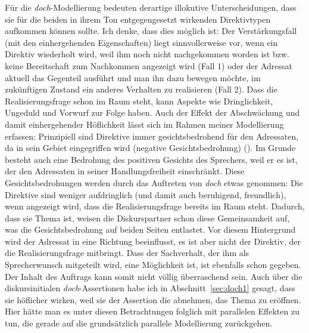\pagebreak Für die \textit{doch}-Modellierung bedeuten derartige illokutive Unterscheidungen, dass sie für die beiden in ihrem Ton entgegengesetzt wirkenden Direktivtypen aufkommen können sollte. Ich denke, dass dies möglich ist: Der Verstärkungsfall (mit den einhergehenden Eigenschaften) liegt sinnvollerweise vor, wenn ein Direktiv wiederholt wird, weil ihm noch nicht nachgekommen worden ist bzw. keine Bereitschaft zum Nachkommen angezeigt wird (Fall 1) oder der Adressat aktuell das Gegenteil ausführt und man ihn dazu bewegen möchte, im zukünftigen Zustand ein anderes Verhalten zu realisieren (Fall 2). Dass die Realisierungsfrage schon im Raum steht, kann Aspekte wie Dringlichkeit, Ungeduld und Vorwurf zur Folge haben. Auch der Effekt der Abschwächung und damit einhergehender Höflichkeit lässt sich im Rahmen meiner Modellierung erfassen: Prinzipiell sind Direktive immer gesichtsbedrohend für den Adressaten, da in sein Gebiet eingegriffen wird (negative  Gesichtsbedrohung) (\citealt[127]{Held1995}). Im Grunde besteht auch eine Bedrohung des positiven Gesichts des Sprechers, weil er es ist, der den Adressaten in seiner Handlungsfreiheit einschränkt. Diese Gesichtsbedrohungen werden durch das Auftreten von \textit{doch} etwas genommen: Die Direktive sind weniger aufdringlich (und damit auch beruhigend, freundlich), wenn angezeigt wird, dass die Realisierungsfrage bereits im Raum steht. Dadurch, dass sie Thema ist, weisen die Diskurspartner schon diese Gemeinsamkeit auf, was die Gesichtsbedrohung auf beiden Seiten entlastet. Vor diesem Hintergrund wird der Adressat in eine Richtung beeinflusst, es ist aber nicht der Direktiv, der die Realisierungsfrage mitbringt. Dass der Sachverhalt, der ihm als Sprecherwunsch mitgeteilt wird, eine Möglichkeit ist, ist ebenfalls schon gegeben. Der Inhalt des Auftrags kann somit nicht völlig überraschend sein. Auch über die diskursinitialen \textit{doch}-Assertionen habe ich in Abschnitt~\ref{sec:doch1} gesagt, dass sie höflicher wirken, weil sie der Assertion die  abnehmen, das Thema zu eröffnen. Hier hätte man es unter diesen Betrachtungen folglich mit parallelen Effekten zu tun, die gerade auf die grundsätzlich parallele Modellierung zurückgehen.

